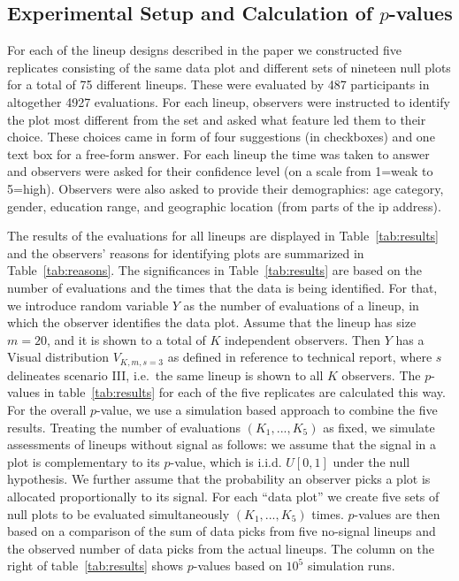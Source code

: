 \documentclass[12pt]{article} %
\newcommand{\hh}[1]{{\color{orange} #1}}
\begin{document}
\subsection{Experimental Setup and Calculation of $p$-values}\label{sec:pvalues}
For each of the lineup designs described in the paper we constructed five replicates consisting of the same data plot and different sets of nineteen null plots for a total of 75 different lineups. These were evaluated by 487 participants in altogether 4927 evaluations. For each lineup, observers were instructed to identify the plot  most different from the set and asked what feature led them to their choice. 
These choices came in form of four suggestions (in checkboxes) and one text box for a free-form answer. For each lineup the time was taken to answer and  observers were asked for their confidence level (on a scale from 1=weak to 5=high). Observers were also asked to provide their demographics: age category, gender,  education range, and geographic location (from parts of the ip address). 

The results of the evaluations for all lineups  are displayed in Table~\ref{tab:results} and the observers' reasons for identifying plots are summarized in Table~\ref{tab:reasons}. 
The significances in Table~\ref{tab:results} are based on the number of evaluations and the times that the data is being identified. For that, we introduce random variable $Y$ as the  number of evaluations of a lineup, in which the observer identifies the data plot. Assume that the lineup has size $m=20$, and it is shown to a total of $K$ independent observers.  Then $Y$ has a Visual distribution $V_{K, m, s=3}$ as defined in \hh{reference to technical report}, where $s$ delineates scenario III, i.e.~the same lineup is shown to all $K$ observers. The $p$-values in table~\ref{tab:results} for each of the five replicates are calculated this way.
For the overall $p$-value, we use a simulation based approach to combine the five results. Treating the number of evaluations $(K_1, ..., K_5)$ as fixed, we simulate assessments of lineups without signal as follows: we assume that the signal in a plot is complementary to its $p$-value, which is i.i.d. $U[0,1]$ under the null hypothesis. We further assume that the probability an observer picks a  plot  is allocated proportionally to its signal. For each ``data plot'' we create five sets of null plots to be evaluated simultaneously $(K_1, ..., K_5)$ times.  
$p$-values are then based on a comparison of the sum of data picks from  five no-signal lineups and  the observed number of data picks from the actual lineups. The column on the right of table~\ref{tab:results} shows $p$-values based on $10^5$ simulation runs.
\end{document}
